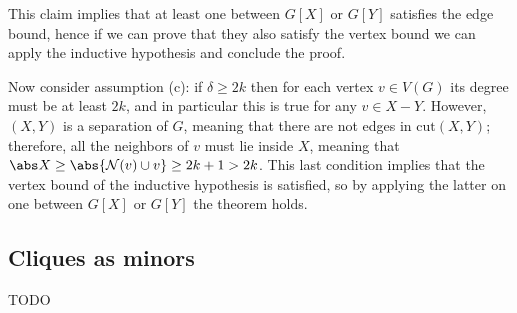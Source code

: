 \documentclass[a4paper, 12pt]{report}
\begin{document}
{        

        This claim implies that at least one between $G[X]$ or $G[Y]$ satisfies the edge bound, hence if we can prove that they also satisfy the vertex bound we can apply the inductive hypothesis and conclude the proof.

        Now consider assumption (c): if $\delta \ge 2k$ then for each vertex $v \in V(G)$ its degree must be at least $2k$, and in particular this is true for any $v \in X - Y$. However, $(X, Y)$ is a separation of $G$, meaning that there are not edges in $\mathrm{cut}(X, Y)$; therefore, all the neighbors of $v$ must lie inside $X$, meaning that $\abs X \ge \abs{\mathcal N(v) \cup v} \ge 2k + 1 > 2k$. This last condition implies that the vertex bound of the inductive hypothesis is satisfied, so by applying the latter on one between $G[X]$ or $G[Y]$ the theorem holds.
    }

    \subsection{Cliques as minors}

    TODO 
\end{document}
